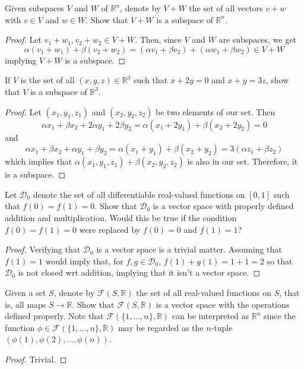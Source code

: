     \question Given subspaces \( V \) and \( W \) of \( \mathbb{R}^n \), denote by \( V + W \) the set of all vectors \( v+w \) with \( v \in V \) and \( w \in W \). Show that \( V+W \) is a subspace of \( \mathbb{R}^n \).
    \begin{proof}
    Let \( v_1+w_1, v_2+w_2 \in V+W \). Then, since \( V \) and \( W \) are subspaces, we get
    \[
    \alpha (v_1+w_1) + \beta (v_2+w_2) = (\alpha v_1 + \beta v_2) + (\alpha w_1 + \beta w_2) \in V + W
    \]
    implying \( V+W \) is a subspace.
    \end{proof}
    
    \question If \( V \) is the set of all \( (x,y,z) \in \mathbb{R}^3 \) such that \( x+2y = 0 \) and \( x+y = 3z \), show that \( V \) is a subspace of \( \mathbb{R}^3 \).
    \begin{proof}
    Let \( (x_1,y_1,z_1) \) and \( (x_2,y_2,z_2) \) be two elements of our set. Then
    \[
    \alpha x_1 + \beta x_2 + 2 \alpha y_1 + 2 \beta y_2 = \alpha (x_1 + 2y_1) + \beta (x_2 + 2y_2) = 0
    \]
    and
    \[
    \alpha x_1 + \beta x_2 + \alpha y_1 + \beta y_2 = \alpha (x_1+y_1) + \beta (x_2+ y_2) = 3 (\alpha z_1 + \beta z_2)
    \]
    which implies that \( \alpha (x_1,y_1,z_1) + \beta (x_2,y_2,z_2) \) is also in our set. Therefore, it is a subspace.
    \end{proof}
    
    \question Let \( \mathscr{D}_0 \) denote the set of all differentiable real-valued functions on \( [0,1] \) such that \( f(0) = f(1) = 0 \). Show that \( \mathscr{D}_0 \) is a vector space with properly defined addition and multiplication. Would this be true if the condition \( f(0) = f(1) = 0 \) were replaced by \( f(0) = 0 \) and \( f(1)=1 \)?
    \begin{proof}
    Verifying that \( \mathscr{D}_0 \) is a vector space is a trivial matter. Assuming that \( f(1) = 1 \) would imply that, for \( f,g \in \mathscr{D}_0 \), \( f(1)+g(1) = 1+1 = 2 \) so that \( \mathscr{D}_0 \) is not closed wrt addition, implying that it isn't a vector space.
    \end{proof}
    
    \question Given a set \( S \), denote by \( \mathscr{F}(S,\mathbb{R}) \) the set of all real-valued functions on \( S \), that is, all maps \( S \rightarrow \mathbb{R} \). Show that \( \mathscr{F}(S, \mathbb{R}) \) is a vector space with the operations defined properly. Note that \( \mathscr{F}(\{ 1,\ldots, n \}, \mathbb{R}) \) can be interpreted as \( \mathbb{R}^n \) since the function \( \phi \in \mathscr{F}(\{ 1,\ldots, n \}, \mathbb{R}) \) may be regarded as the \( n \)-tuple \( (\phi(1),\phi(2),\ldots,\phi(n)) \).
    \begin{proof}
    Trivial.
    \end{proof}
    
